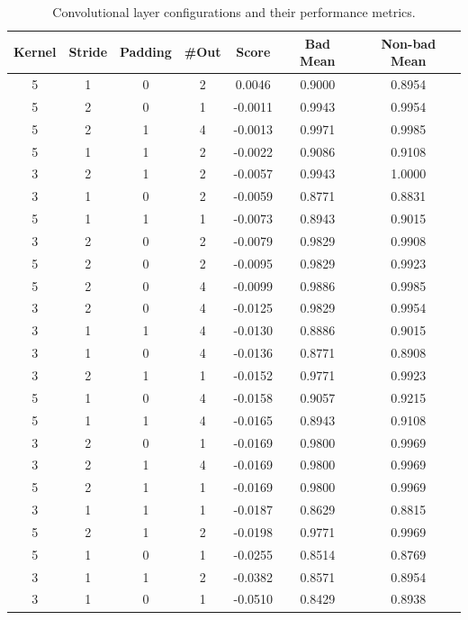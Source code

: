 \documentclass{article}
\begin{document}
\begin{table}[htbp]
  \centering
  \small
  \caption{Convolutional layer configurations and their performance metrics.}
  \label{tab:appendix_experiments}
  \begin{tabular}{ccccccc}
    \toprule
    Kernel & Stride & Padding & \#Out & Score & Bad Mean & Non-bad Mean \\
    \midrule
     5 & 1 & 0 & 2 &  0.0046 & 0.9000 & 0.8954 \\
     5 & 2 & 0 & 1 & -0.0011 & 0.9943 & 0.9954 \\
     5 & 2 & 1 & 4 & -0.0013 & 0.9971 & 0.9985 \\
     5 & 1 & 1 & 2 & -0.0022 & 0.9086 & 0.9108 \\
     3 & 2 & 1 & 2 & -0.0057 & 0.9943 & 1.0000 \\
     3 & 1 & 0 & 2 & -0.0059 & 0.8771 & 0.8831 \\
     5 & 1 & 1 & 1 & -0.0073 & 0.8943 & 0.9015 \\
     3 & 2 & 0 & 2 & -0.0079 & 0.9829 & 0.9908 \\
     5 & 2 & 0 & 2 & -0.0095 & 0.9829 & 0.9923 \\
     5 & 2 & 0 & 4 & -0.0099 & 0.9886 & 0.9985 \\
     3 & 2 & 0 & 4 & -0.0125 & 0.9829 & 0.9954 \\
     3 & 1 & 1 & 4 & -0.0130 & 0.8886 & 0.9015 \\
     3 & 1 & 0 & 4 & -0.0136 & 0.8771 & 0.8908 \\
     3 & 2 & 1 & 1 & -0.0152 & 0.9771 & 0.9923 \\
     5 & 1 & 0 & 4 & -0.0158 & 0.9057 & 0.9215 \\
     5 & 1 & 1 & 4 & -0.0165 & 0.8943 & 0.9108 \\
     3 & 2 & 0 & 1 & -0.0169 & 0.9800 & 0.9969 \\
     3 & 2 & 1 & 4 & -0.0169 & 0.9800 & 0.9969 \\
     5 & 2 & 1 & 1 & -0.0169 & 0.9800 & 0.9969 \\
     3 & 1 & 1 & 1 & -0.0187 & 0.8629 & 0.8815 \\
     5 & 2 & 1 & 2 & -0.0198 & 0.9771 & 0.9969 \\
     5 & 1 & 0 & 1 & -0.0255 & 0.8514 & 0.8769 \\
     3 & 1 & 1 & 2 & -0.0382 & 0.8571 & 0.8954 \\
     3 & 1 & 0 & 1 & -0.0510 & 0.8429 & 0.8938 \\
    \bottomrule
  \end{tabular}
\end{table}
\end{document}
